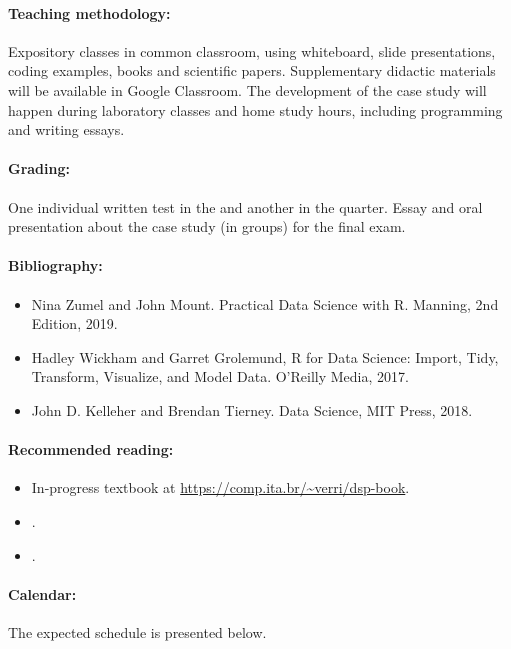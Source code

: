 \paragraph{Teaching methodology:}
Expository classes in common classroom, using whiteboard, slide presentations, coding
examples, books and scientific papers. Supplementary didactic materials will be available
in Google Classroom. The development of the case study will happen during laboratory
classes and home study hours, including programming and writing essays.

\paragraph{Grading:} One individual written test in the  and another in the  quarter.
Essay and oral presentation about the case study (in groups) for the final exam.

\paragraph{Bibliography:}
\begin{itemize}
  \item Nina Zumel and John Mount. Practical Data Science with R. Manning, 2nd Edition, 2019.
  \item Hadley Wickham and Garret Grolemund, R for Data Science: Import, Tidy, Transform, Visualize, and Model Data. O’Reilly Media, 2017.
  \item John D. Kelleher and Brendan Tierney. Data Science, MIT Press, 2018.
\end{itemize}

\thispagestyle{empty}
\paragraph{Recommended reading:}
\begin{itemize}
  \item In-progress textbook at \url{https://comp.ita.br/~verri/dsp-book}.
  \item {}.
  \item {}.
\end{itemize}

\paragraph{Calendar:} The expected schedule is presented below.

